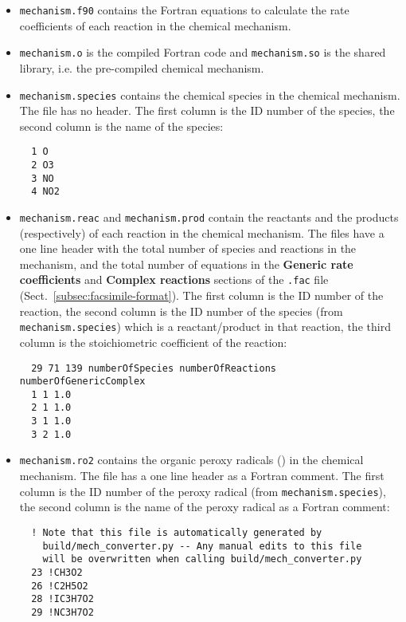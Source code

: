 \begin{itemize}
\item \texttt{mechanism.f90} contains the Fortran equations to
  calculate the rate coefficients of each reaction in the chemical
  mechanism.
\item \texttt{mechanism.o} is the compiled Fortran code and
  \texttt{mechanism.so} is the shared library, i.e. the pre-compiled
  chemical mechanism.
\item \texttt{mechanism.species} contains the chemical species in the
  chemical mechanism. The file has no header. The first column is the
  ID number of the species, the second column is the name of the
  species:
  \begin{verbatim}
  1 O
  2 O3
  3 NO
  4 NO2
  \end{verbatim}
\item \texttt{mechanism.reac} and \texttt{mechanism.prod} contain the
  reactants and the products (respectively) of each reaction in the
  chemical mechanism. The files have a one line header with the total
  number of species and reactions in the mechanism, and the total
  number of equations in the \textbf{Generic rate coefficients} and
  \textbf{Complex reactions} sections of the \texttt{.fac} file
  (Sect.~\ref{subsec:facsimile-format}). The first column is the ID
  number of the reaction, the second column is the ID number of the
  species (from \texttt{mechanism.species}) which is a
  reactant/product in that reaction, the third column is the
  stoichiometric coefficient of the reaction:
  \begin{verbatim}
  29 71 139 numberOfSpecies numberOfReactions numberOfGenericComplex
  1 1 1.0
  2 1 1.0
  3 1 1.0
  3 2 1.0
  \end{verbatim}
\item \texttt{mechanism.ro2} contains the organic peroxy radicals
  () in the chemical mechanism. The file has a one line header
  as a Fortran comment. The first column is the ID number of the
  peroxy radical (from \texttt{mechanism.species}), the second column
  is the name of the peroxy radical as a Fortran comment:
  \begin{verbatim}
  ! Note that this file is automatically generated by
    build/mech_converter.py -- Any manual edits to this file
    will be overwritten when calling build/mech_converter.py
  23 !CH3O2
  26 !C2H5O2
  28 !IC3H7O2
  29 !NC3H7O2
  \end{verbatim}
\end{itemize}

